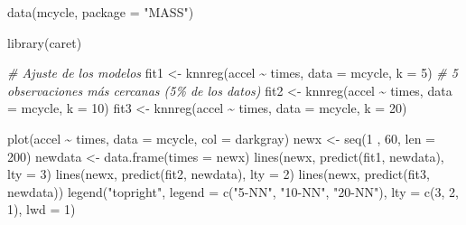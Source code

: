 \documentclass[
]{book}
\newenvironment{Shaded}{\begin{snugshade}}{\end{snugshade}}
\newcommand{\AttributeTok}[1]{\textcolor[rgb]{0.77,0.63,0.00}{#1}}
\newcommand{\CommentTok}[1]{\textcolor[rgb]{0.56,0.35,0.01}{\textit{#1}}}
\newcommand{\DecValTok}[1]{\textcolor[rgb]{0.00,0.00,0.81}{#1}}
\newcommand{\FunctionTok}[1]{\textcolor[rgb]{0.00,0.00,0.00}{#1}}
\newcommand{\NormalTok}[1]{#1}
\newcommand{\OtherTok}[1]{\textcolor[rgb]{0.56,0.35,0.01}{#1}}
\newcommand{\SpecialCharTok}[1]{\textcolor[rgb]{0.00,0.00,0.00}{#1}}
\newcommand{\StringTok}[1]{\textcolor[rgb]{0.31,0.60,0.02}{#1}}
\theoremstyle{break}
\theoremstyle{definition}
\theoremstyle{definition}
\theoremstyle{definition}
\theoremstyle{definition}
\theoremstyle{remark}
\begin{document}
\begin{Shaded}
\begin{Highlighting}[]
\FunctionTok{data}\NormalTok{(mcycle, }\AttributeTok{package =} \StringTok{"MASS"}\NormalTok{)}

\FunctionTok{library}\NormalTok{(caret)}

\CommentTok{\# Ajuste de los modelos}
\NormalTok{fit1 }\OtherTok{\textless{}{-}} \FunctionTok{knnreg}\NormalTok{(accel }\SpecialCharTok{\textasciitilde{}}\NormalTok{ times, }\AttributeTok{data =}\NormalTok{ mcycle, }\AttributeTok{k =} \DecValTok{5}\NormalTok{) }\CommentTok{\# 5 observaciones más cercanas (5\% de los datos)}
\NormalTok{fit2 }\OtherTok{\textless{}{-}} \FunctionTok{knnreg}\NormalTok{(accel }\SpecialCharTok{\textasciitilde{}}\NormalTok{ times, }\AttributeTok{data =}\NormalTok{ mcycle, }\AttributeTok{k =} \DecValTok{10}\NormalTok{)}
\NormalTok{fit3 }\OtherTok{\textless{}{-}} \FunctionTok{knnreg}\NormalTok{(accel }\SpecialCharTok{\textasciitilde{}}\NormalTok{ times, }\AttributeTok{data =}\NormalTok{ mcycle, }\AttributeTok{k =} \DecValTok{20}\NormalTok{)}

\FunctionTok{plot}\NormalTok{(accel }\SpecialCharTok{\textasciitilde{}}\NormalTok{ times, }\AttributeTok{data =}\NormalTok{ mcycle, }\AttributeTok{col =} \StringTok{\textquotesingle{}darkgray\textquotesingle{}}\NormalTok{) }
\NormalTok{newx }\OtherTok{\textless{}{-}} \FunctionTok{seq}\NormalTok{(}\DecValTok{1}\NormalTok{ , }\DecValTok{60}\NormalTok{, }\AttributeTok{len =} \DecValTok{200}\NormalTok{)}
\NormalTok{newdata }\OtherTok{\textless{}{-}} \FunctionTok{data.frame}\NormalTok{(}\AttributeTok{times =}\NormalTok{ newx)}
\FunctionTok{lines}\NormalTok{(newx, }\FunctionTok{predict}\NormalTok{(fit1, newdata), }\AttributeTok{lty =} \DecValTok{3}\NormalTok{)}
\FunctionTok{lines}\NormalTok{(newx, }\FunctionTok{predict}\NormalTok{(fit2, newdata), }\AttributeTok{lty =} \DecValTok{2}\NormalTok{)}
\FunctionTok{lines}\NormalTok{(newx, }\FunctionTok{predict}\NormalTok{(fit3, newdata))}
\FunctionTok{legend}\NormalTok{(}\StringTok{"topright"}\NormalTok{, }\AttributeTok{legend =} \FunctionTok{c}\NormalTok{(}\StringTok{"5{-}NN"}\NormalTok{, }\StringTok{"10{-}NN"}\NormalTok{, }\StringTok{"20{-}NN"}\NormalTok{), }
       \AttributeTok{lty =} \FunctionTok{c}\NormalTok{(}\DecValTok{3}\NormalTok{, }\DecValTok{2}\NormalTok{, }\DecValTok{1}\NormalTok{), }\AttributeTok{lwd =} \DecValTok{1}\NormalTok{)}
\end{Highlighting}
\end{Shaded}
\end{document}
